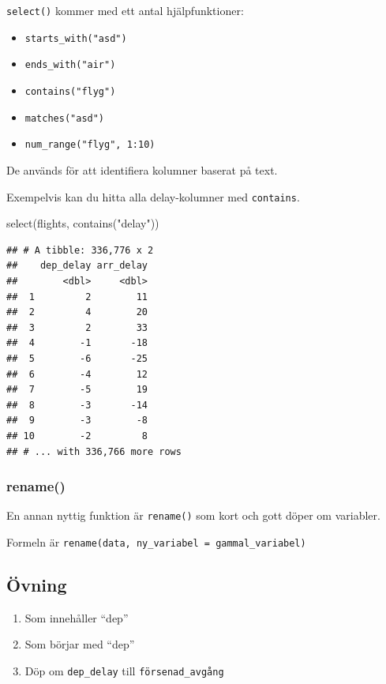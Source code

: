 \documentclass[
]{book}
\newenvironment{Shaded}{\begin{snugshade}}{\end{snugshade}}
\newcommand{\FunctionTok}[1]{\textcolor[rgb]{0.00,0.00,0.00}{#1}}
\newcommand{\NormalTok}[1]{#1}
\newcommand{\StringTok}[1]{\textcolor[rgb]{0.31,0.60,0.02}{#1}}
\providecommand{\tightlist}{%
  \setlength{\itemsep}{0pt}\setlength{\parskip}{0pt}}
\begin{document}
\texttt{select()} kommer med ett antal hjälpfunktioner:

\begin{itemize}
\tightlist
\item
  \texttt{starts\_with("asd")}
\item
  \texttt{ends\_with("air")}
\item
  \texttt{contains("flyg")}
\item
  \texttt{matches("asd")}
\item
  \texttt{num\_range("flyg",\ 1:10)}
\end{itemize}

De används för att identifiera kolumner baserat på text.

Exempelvis kan du hitta alla delay-kolumner med \texttt{contains}.

\begin{Shaded}
\begin{Highlighting}[]
\FunctionTok{select}\NormalTok{(flights, }\FunctionTok{contains}\NormalTok{(}\StringTok{"delay"}\NormalTok{))}
\end{Highlighting}
\end{Shaded}

\begin{verbatim}
## # A tibble: 336,776 x 2
##    dep_delay arr_delay
##        <dbl>     <dbl>
##  1         2        11
##  2         4        20
##  3         2        33
##  4        -1       -18
##  5        -6       -25
##  6        -4        12
##  7        -5        19
##  8        -3       -14
##  9        -3        -8
## 10        -2         8
## # ... with 336,766 more rows
\end{verbatim}

\hypertarget{rename}{%
\subsubsection{rename()}\label{rename}}

En annan nyttig funktion är \texttt{rename()} som kort och gott döper om variabler.

Formeln är \texttt{rename(data,\ ny\_variabel\ =\ gammal\_variabel)}

\hypertarget{uxf6vning-2}{%
\subsection{Övning}\label{uxf6vning-2}}

\begin{enumerate}
\def\labelenumi{\arabic{enumi}.}
\tightlist
\item
  Som innehåller ``dep''
\item
  Som börjar med ``dep''
\item
  Döp om \texttt{dep\_delay} till \texttt{försenad\_avgång}
\end{enumerate}
\end{document}
